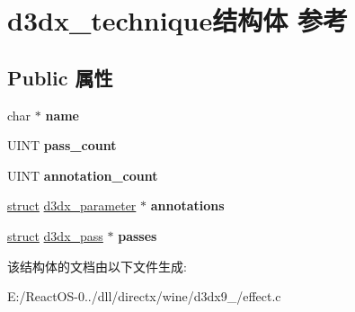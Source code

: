 \hypertarget{structd3dx__technique}{}\section{d3dx\+\_\+technique结构体 参考}
\label{structd3dx__technique}
\subsection*{Public 属性}
\begin{DoxyCompactItemize}
\item 
\mbox{\label{structd3dx__technique_aa246136b1d50a297aa3a5f4dec5c433c}} 
char $\ast$ {\bfseries name}
\item 
\mbox{\label{structd3dx__technique_ac7bdd46e496795c8ef99f5cb80c17cd8}} 
U\+I\+NT {\bfseries pass\+\_\+count}
\item 
\mbox{\label{structd3dx__technique_aa4f2e373ed0c089cf18bc3e9fada1bba}} 
U\+I\+NT {\bfseries annotation\+\_\+count}
\item 
\mbox{\label{structd3dx__technique_a2b3610910d03c12cf84029488383cbd5}} 
\hyperlink{interfacestruct}{struct} \hyperlink{structd3dx__parameter}{d3dx\+\_\+parameter} $\ast$ {\bfseries annotations}
\item 
\mbox{\label{structd3dx__technique_a1cca58940f2d929e0b7afdf5d7ee96e1}} 
\hyperlink{interfacestruct}{struct} \hyperlink{structd3dx__pass}{d3dx\+\_\+pass} $\ast$ {\bfseries passes}
\end{DoxyCompactItemize}


该结构体的文档由以下文件生成\+:\begin{DoxyCompactItemize}
\item 
E\+:/\+React\+O\+S-\/0../dll/directx/wine/d3dx9\+\_/effect.\+c\end{DoxyCompactItemize}
